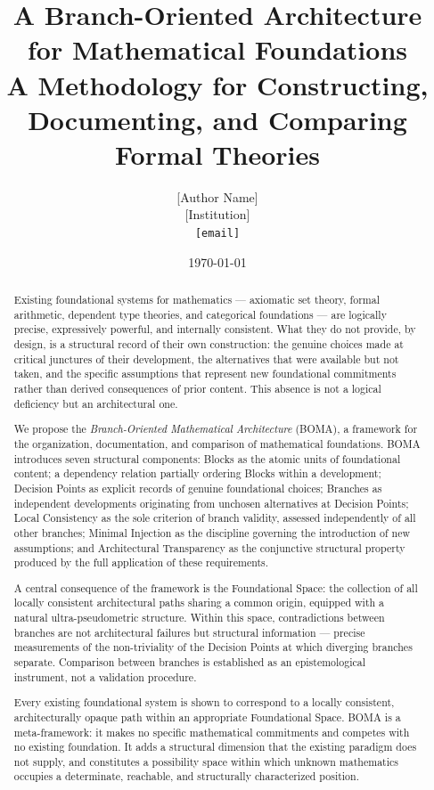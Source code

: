 \documentclass[12pt, a4paper]{article}
\title{%
  \textbf{A Branch-Oriented Architecture for Mathematical Foundations}\\[0.5em]
  \large A Methodology for Constructing, Documenting,
  and Comparing Formal Theories%
}
\author{%
  [Author Name]\\
  \small [Institution]\\
  \small \texttt{[email]}%
}
\date{\today}
\theoremstyle{plain}
\theoremstyle{definition}
\theoremstyle{remark}
\newcommand{\BOMA}{\textsf{BOMA}}
\begin{document}

\maketitle

\begin{abstract}
Existing foundational systems for mathematics ---
axiomatic set theory, formal arithmetic, dependent type theories,
and categorical foundations --- are logically precise,
expressively powerful, and internally consistent.
What they do not provide, by design, is a structural record
of their own construction: the genuine choices made at critical
junctures of their development, the alternatives that were available
but not taken, and the specific assumptions that represent new
foundational commitments rather than derived consequences of prior
content. This absence is not a logical deficiency but an
architectural one.

We propose the \emph{Branch-Oriented Mathematical Architecture}
(\BOMA{}), a framework for the organization, documentation, and
comparison of mathematical foundations. \BOMA{} introduces seven
structural components: Blocks as the atomic units of foundational
content; a dependency relation partially ordering Blocks within a
development; Decision Points as explicit records of genuine
foundational choices; Branches as independent developments
originating from unchosen alternatives at Decision Points; Local
Consistency as the sole criterion of branch validity, assessed
independently of all other branches; Minimal Injection as the
discipline governing the introduction of new assumptions; and
Architectural Transparency as the conjunctive structural property
produced by the full application of these requirements.

A central consequence of the framework is the Foundational Space:
the collection of all locally consistent architectural paths
sharing a common origin, equipped with a natural
ultra-pseudometric structure. Within this space, contradictions
between branches are not architectural failures but structural
information --- precise measurements of the non-triviality of the
Decision Points at which diverging branches separate.
Comparison between branches is established as an epistemological
instrument, not a validation procedure.

Every existing foundational system is shown to correspond to a
locally consistent, architecturally opaque path within an
appropriate Foundational Space. \BOMA{} is a meta-framework: it
makes no specific mathematical commitments and competes with no
existing foundation. It adds a structural dimension that the
existing paradigm does not supply, and constitutes a possibility
space within which unknown mathematics occupies a determinate,
reachable, and structurally characterized position.
\end{abstract}
\end{document}
